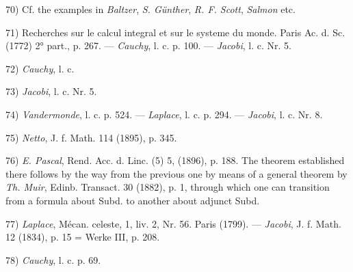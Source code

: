 \vspace{-0.1cm}
\leftline{\rule{2in}{0.4pt}}
\vspace{0.1cm}
{
\footnotesize
70) Cf. the examples in \textit{Baltzer}, \textit{S. Günther}, \textit{R. F. Scott}, \textit{Salmon} etc.

71) Recherches sur le calcul integral et sur le systeme du monde. Paris Ac. d. Sc. (1772) 2° part., p. 267. — \textit{Cauchy}, l. c. p. 100. — \textit{Jacobi}, l. c. Nr. 5.

72) \textit{Cauchy}, l. c.

73) \textit{Jacobi}, l. c. Nr. 5.

74) \textit{Vandermonde}, l. c. p. 524. — \textit{Laplace}, l. c. p. 294. — \textit{Jacobi}, l. c. Nr. 8.

75) \textit{Netto}, J. f. Math. 114 (1895), p. 345.

76) \textit{E. Pascal}, Rend. Acc. d. Linc. (5) 5, (1896), p. 188. The theorem established there follows by the way from the previous one by means of a general theorem by \textit{Th. Muir}, Edinb. Transact. 30 (1882), p. 1, through which one can transition from a formula about Subd. to another about adjunct Subd.

77) \textit{Laplace}, Mécan. celeste, 1, liv. 2, Nr. 56. Paris (1799). — \textit{Jacobi}, J. f. Math. 12 (1834), p. 15 = Werke III, p. 208.

78) \textit{Cauchy}, l. c. p. 69.

}
